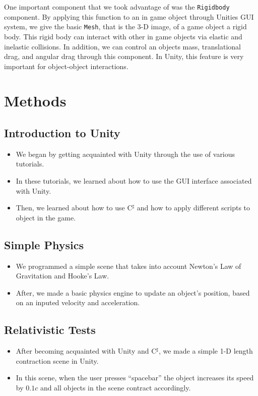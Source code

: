 \documentclass[12pt]{article}
\newcommand{\csharp}{C$^\sharp$}
\begin{document}
One important component that we took advantage of was the \texttt{Rigidbody} component. By applying this function to an in game object through Unities GUI system, we give the basic \texttt{Mesh}, that is the 3-D image, of a game object a rigid body. This rigid body can interact with other in game objects via elastic and inelastic collisions. In addition, we can control an objects mass, translational drag, and angular drag through this component. In Unity, this feature is very important for object-object interactions.

\section{Methods}
\subsection{Introduction to Unity}
\begin{itemize}
	\item We began by getting acquainted with Unity through the use of various tutorials.
	\item In these tutorials, we learned about how to use the GUI interface associated with Unity.
	\item Then, we learned about how to use \csharp{} and how to apply different scripts to object in the game.
\end{itemize}

\subsection{Simple Physics}
\begin{itemize}
	\item We programmed a simple scene that takes into account Newton's Law of Gravitation and Hooke's Law.
	\item After, we made a basic physics engine to update an object's position, based on an inputed velocity and acceleration.
\end{itemize}

\subsection{Relativistic Tests}
\begin{itemize}
	\item After becoming acquainted with Unity and \csharp{}, we made a simple 1-D length contraction scene in Unity. 
	\item In this scene, when the user presses \enquote{spacebar} the object increases its speed by $0.1c$ and all objects in the scene contract accordingly.
\end{itemize}
\end{document}
